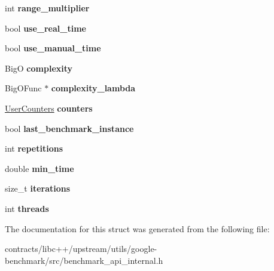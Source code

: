 \begin{DoxyCompactItemize}
int {\bfseries range\+\_\+multiplier}
\item 
\mbox{\label{structbenchmark_1_1internal_1_1_benchmark_1_1_instance_a0f88731c2efa84e1ea9e2c8ca87acf53}} 
bool {\bfseries use\+\_\+real\+\_\+time}
\item 
\mbox{\label{structbenchmark_1_1internal_1_1_benchmark_1_1_instance_a090143499c22a8c67ff77fa30e2b13cb}} 
bool {\bfseries use\+\_\+manual\+\_\+time}
\item 
\mbox{\label{structbenchmark_1_1internal_1_1_benchmark_1_1_instance_a8dc337f7caee02b3ee16cd8a33e2d4e0}} 
BigO {\bfseries complexity}
\item 
\mbox{\label{structbenchmark_1_1internal_1_1_benchmark_1_1_instance_ac61e0c885a47d4b180dea13259dd4454}} 
Big\+O\+Func $\ast$ {\bfseries complexity\+\_\+lambda}
\item 
\mbox{\label{structbenchmark_1_1internal_1_1_benchmark_1_1_instance_a0733cfa8d1841f242355573279004705}} 
\mbox{\hyperlink{classstd_1_1map}{User\+Counters}} {\bfseries counters}
\item 
\mbox{\label{structbenchmark_1_1internal_1_1_benchmark_1_1_instance_aa18a090edea50ffe3df15e41db295502}} 
bool {\bfseries last\+\_\+benchmark\+\_\+instance}
\item 
\mbox{\label{structbenchmark_1_1internal_1_1_benchmark_1_1_instance_ae67f1bc5d1f93234de0bf18dee1a3df2}} 
int {\bfseries repetitions}
\item 
\mbox{\label{structbenchmark_1_1internal_1_1_benchmark_1_1_instance_ae62901d82466c8a3f68980f3794521f5}} 
double {\bfseries min\+\_\+time}
\item 
\mbox{\label{structbenchmark_1_1internal_1_1_benchmark_1_1_instance_a7df46d07a618a886547cde6a0e0920f2}} 
size\+\_\+t {\bfseries iterations}
\item 
\mbox{\label{structbenchmark_1_1internal_1_1_benchmark_1_1_instance_af2db1c18957c4ae0ed9fa4481c04a767}} 
int {\bfseries threads}
\end{DoxyCompactItemize}


The documentation for this struct was generated from the following file\+:\begin{DoxyCompactItemize}
\item 
contracts/libc++/upstream/utils/google-\/benchmark/src/benchmark\+\_\+api\+\_\+internal.\+h\end{DoxyCompactItemize}
